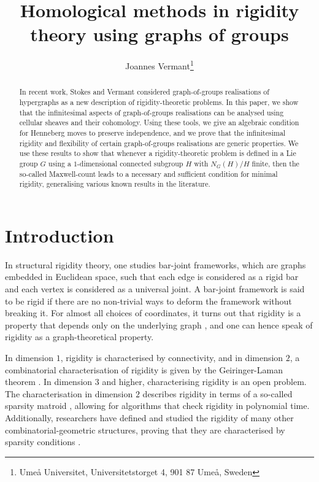 \documentclass{article}
\title{Homological methods in rigidity theory using graphs of groups}
\author{Joannes Vermant\thanks{Ume{\aa} Universitet, Universitetstorget 4, 901 87 Umeå, Sweden}}
\date{}
\theoremstyle{definition}
\theoremstyle{remark}
\begin{document}
\maketitle

\begin{abstract}
In recent work, Stokes and Vermant considered graph-of-groups realisations of hypergraphs as a new description of rigidity-theoretic problems. In this paper, we show that the infinitesimal aspects of graph-of-groups realisations can be analysed using cellular sheaves and their cohomology. Using these tools, we give an algebraic condition for Henneberg moves to preserve independence, and we prove that the infinitesimal rigidity and flexibility of certain graph-of-groups realisations are generic properties. We use these results to show that whenever a rigidity-theoretic problem is defined in a Lie group $G$ using a $1$-dimensional connected subgroup $H$ with $N_{G}(H)/H$ finite, then the so-called Maxwell-count leads to a necessary and sufficient condition for minimal rigidity, generalising various known results in the literature.
\end{abstract}

\section{Introduction}\label{sec: Introduction}
In structural rigidity theory, one studies bar-joint frameworks, which are graphs embedded in Euclidean space, such that each edge is considered as a rigid bar and each vertex is considered as a universal joint. A bar-joint framework is said to be rigid if there are no non-trivial ways to deform the framework without breaking it. For almost all choices of coordinates, it turns out that rigidity is a property that depends only on the underlying graph \cite{cf04a725-5f21-3920-aafd-d5f8dd4a83ae}, and one can hence speak of rigidity as a graph-theoretical property. 

In dimension $1$, rigidity is characterised by connectivity, and in dimension $2$, a combinatorial characterisation of rigidity is given by the Geiringer-Laman theorem \cite{PollaczekGeiringer1927, Laman1970}. In dimension $3$ and higher, characterising rigidity is an open problem. The characterisation in dimension $2$ describes rigidity in terms of a so-called sparsity matroid \cite[Section 13.5]{Frank2012}, allowing for algorithms that check rigidity in polynomial time. Additionally, researchers have defined and studied the rigidity of many other combinatorial-geometric structures, proving that they are characterised by sparsity conditions \cite{ Whiteley1989, TAY198495, Tay1989, Katoh2011, 10.1093/imrn/rny170}. 
\end{document}
